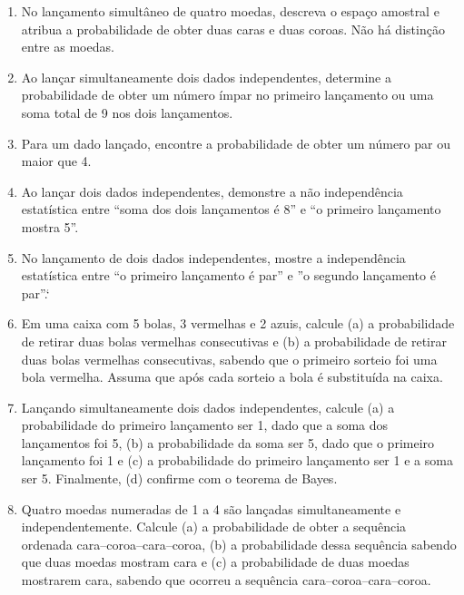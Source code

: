 \begin{enumerate}[label=\textbf{\arabic{chapter}.\arabic*.}]
\item No lançamento simultâneo de quatro moedas, descreva o espaço amostral e atribua a probabilidade de obter duas caras e duas coroas. Não há distinção entre as moedas.

\item Ao lançar simultaneamente dois dados independentes, determine a probabilidade de obter um número ímpar no primeiro lançamento ou uma soma total de 9 nos dois lançamentos.

\item Para um dado lançado, encontre a probabilidade de obter um número par ou maior que 4.

\item Ao lançar dois dados independentes, demonstre a não independência estatística entre ``soma dos dois lançamentos é 8'' e ``o primeiro lançamento mostra 5''.

\item No lançamento de dois dados independentes, mostre a independência estatística entre ``o primeiro lançamento é par'' e ''o segundo lançamento é par''.`

\item Em uma caixa com 5 bolas, 3 vermelhas e 2 azuis, calcule (a) a probabilidade de retirar duas bolas vermelhas consecutivas e (b) a probabilidade de retirar duas bolas vermelhas consecutivas, sabendo que o primeiro sorteio foi uma bola vermelha. Assuma que após cada sorteio a bola é substituída na caixa.

\item  Lançando simultaneamente dois dados independentes, calcule (a) a probabilidade do primeiro lançamento ser 1, dado que a soma dos lançamentos foi 5, (b) a probabilidade da soma ser 5, dado que o primeiro lançamento foi 1 e (c) a probabilidade do primeiro lançamento ser 1 e a soma ser 5. Finalmente, (d) confirme com o teorema de Bayes.

\item Quatro moedas numeradas de 1 a 4 são lançadas simultaneamente e independentemente. Calcule (a) a probabilidade de obter a sequência ordenada cara–coroa–cara–coroa, (b) a probabilidade dessa sequência sabendo que duas moedas mostram cara e (c) a probabilidade de duas moedas mostrarem cara, sabendo que ocorreu a sequência cara–coroa–cara–coroa.
\end{enumerate}

